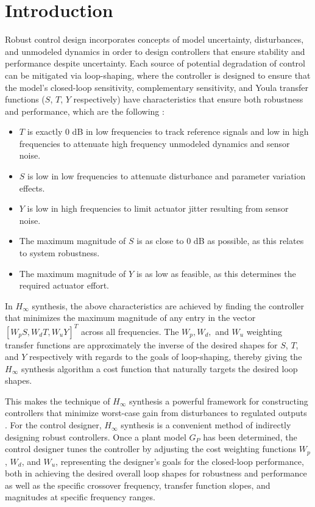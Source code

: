 \documentclass[journal,article,submit,pdftex,moreauthors]{Definitions/mdpi}
\begin{document}
\section{Introduction}
\label{sec:introduction}
Robust control design incorporates concepts of model uncertainty, disturbances, and unmodeled dynamics in order to design controllers that ensure stability and performance despite uncertainty. Each source of potential degradation of control can be mitigated via loop-shaping, where the controller is designed to ensure that the model's closed-loop sensitivity, complementary sensitivity, and Youla transfer functions ($S$, $T$, $Y$ respectively) have characteristics that ensure both robustness and performance, which are the following \citep{assadian2022robust}:
\begin{itemize}
\item $T$ is exactly 0 dB in low frequencies to track reference signals and low in high frequencies to attenuate high frequency unmodeled dynamics and sensor noise.
\item $S$ is low in low frequencies to attenuate disturbance and parameter variation effects.
\item $Y$ is low in high frequencies to limit actuator jitter resulting from sensor noise.
\item The maximum magnitude of $S$ is as close to 0 dB as possible, as this relates to system robustness.
\item The maximum magnitude of $Y$ is as low as feasible, as this determines the required actuator effort.
\end{itemize}

In $H_\infty$ synthesis, the above characteristics are achieved by finding the controller that minimizes the maximum magnitude of any entry in the vector \([W_pS, W_dT, W_uY]^T\) across all frequencies. The $W_p, W_d,$ and $W_u$ weighting transfer functions are approximately the inverse of the desired shapes for $S$, $T$, and $Y$ respectively with regards to the goals of loop-shaping, thereby giving the $H_\infty$ synthesis algorithm a cost function that naturally targets the desired loop shapes.

This makes the technique of $H_\infty$ synthesis a powerful framework for constructing controllers that minimize worst-case gain from disturbances to regulated outputs \citep{zhou1996robust, skogestad2005multivariable}. For the control designer, $H_\infty$ synthesis is a convenient method of indirectly designing robust controllers. Once a plant model $G_P$ has been determined, the control designer tunes the controller by adjusting the cost weighting functions $W_p$, $W_d$, and $W_u$, representing the designer's goals for the closed-loop performance, both in achieving the desired overall loop shapes for robustness and performance as well as the specific crossover frequency, transfer function slopes, and magnitudes at specific frequency ranges.
\end{document}
